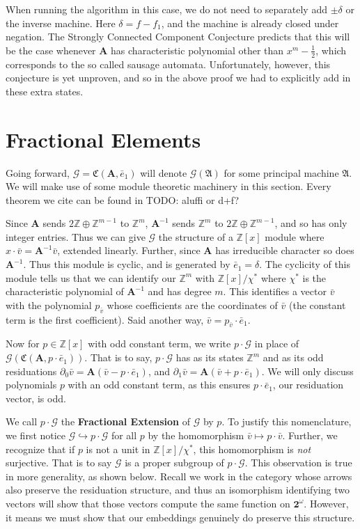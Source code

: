 \documentclass[runningheads]{llncs}
\newcommand{\G}{\mathcal{G}}
\renewcommand{\P}{\mathfrak{A}}
\newcommand{\Z}{\mathbb{Z}}
\newcommand{\2}{\textbf{2}}
\newcommand{\Am}{\textbf{A}}
\newcommand{\del}{\partial}
\newcommand{\vv}{\bar{v}}
\newcommand{\e}{\bar{e}}
\begin{document}
When running the algorithm in this case, we do not need to separately add
$\pm \delta$ or the inverse machine. Here $\delta = f - f_1$, and the machine
is already closed under negation. The Strongly Connected Component Conjecture 
predicts that this will be the case whenever $\Am$ has characteristic 
polynomial other than $x^m - \frac{1}{2}$, which corresponds to the so called 
sausage automata. Unfortunately, however, this conjecture is yet unproven,
and so in the above proof we had to explicitly add in these extra states.

\section{Fractional Elements}
Going forward, $\G = \mathfrak{C}(\Am,\e_1)$ will denote $\G(\P)$ for some 
principal machine $\P$. We will make use of some module theoretic machinery 
in this section. Every theorem we cite can be found in \cite{} TODO: aluffi or d+f? 

Since $\Am$ sends $2\Z \oplus \Z^{m-1}$ to $\Z^m$, 
$\Am^{-1}$ sends $\Z^m$ to $2\Z \oplus \Z^{m-1}$, and so has 
only integer entries. Thus we can give $\G$ the structure of a 
$\Z[x]$ module where $x \cdot \vv = \Am^{-1}\vv$, extended linearly. Further, 
since $\Am$ has irreducible character so does $\Am^{-1}$. Thus this module is 
cyclic, and is generated by $\e_1 = \delta$. The cyclicity of this module tells 
us that we can identify our $\Z^m$ with $\Z[x] / \chi^*$ where $\chi^*$ is the 
characteristic polynomial of $\Am^{-1}$ and has degree $m$. This identifies
a vector $\vv$ with the polynomial $p_{\vv}$ whose coefficients are the 
coordinates of $\vv$ (the constant term is the first coefficient). Said 
another way, $\vv = p_{\vv} \cdot \e_1$.

Now for $p \in \Z[x]$ with odd constant term, we write
$p \cdot \G$ in place of $\G(\mathfrak{C}(\Am, p \cdot \e_1))$.
That is to say, $p \cdot \G$ has as its states $\Z^m$ and as its 
odd residuations
$\del_0 \vv = \Am (\vv - p \cdot \e_1)$, and 
$\del_1 \vv = \Am (\vv + p \cdot \e_1)$.
We will only discuss polynomials $p$ with an odd constant term, as 
this ensures $p \cdot \e_1$, our residuation vector, is odd.

We call $p \cdot \G$ the \textbf{Fractional Extension} of $\G$ by $p$.
To justify this nomenclature, we first notice 
$\G \hookrightarrow p \cdot \G$ for all $p$ by the
homomorphism $\vv \mapsto p \cdot \vv$. 
Further, we recognize that if $p$ is not a unit in 
$\Z[x] / \chi^*$, this homomorphism is \emph{not} 
surjective. That is to say $\G$ is a proper subgroup of $p \cdot \G$.
This observation is true in more generality, as shown below.
Recall we work in the category whose arrows also preserve the residuation
structure, and thus an isomorphism identifying two vectors will show that
those vectors compute the same function on $\2^\omega$. However, it means
we must show that our embeddings genuinely do preserve this structure.
\end{document}
